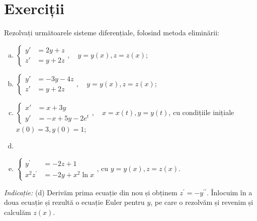 
\section{Exerciții}

Rezolvați următoarele sisteme diferențiale, folosind metoda eliminării:
\begin{enumerate}[(a)]
\item $ \begin{cases}
    y' &= 2y + z \\
    z' &= y + 2z
  \end{cases}, \quad y = y(x), z = z(x)
  $;
\item $ \begin{cases}
    y' &= -3y - 4z \\
    z' &= y + 2z
  \end{cases}, \quad y = y(x), z = z(x)
  $;
\item $ \begin{cases}
    x' &= x + 3y \\
    y' &= -x + 5y - 2e^t
  \end{cases}, \quad x = x(t), y = y(t) $,
  cu condițiile inițiale $ x(0) = 3, y(0) = 1 $;
\item \item $ \begin{cases}
    y^\prime &= -2z + 1 \\
    x^2 z^\prime &= -2y + x^2 \ln x
  \end{cases} $, cu $ y = y(x), z = z(x) $.
\end{enumerate}

\emph{Indicație:} (d) Derivăm prima ecuație din nou și obținem $ z^\prime = - y^{\prime\prime} $. Înlocuim în
a doua ecuație și rezultă o ecuație Euler pentru $ y $, pe care o rezolvăm și revenim și calculăm
$ z(x) $.






